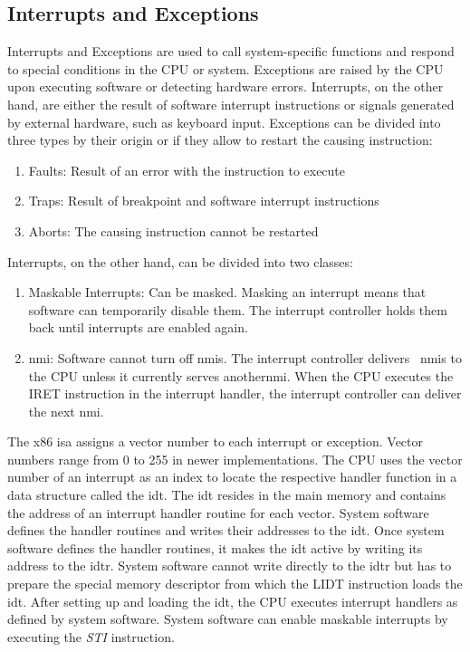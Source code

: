 \subsection{Interrupts and Exceptions}
\label{sec:state:technical:interrupts}
Interrupts and Exceptions are used to call system-specific functions and respond
to special conditions in the CPU or system. Exceptions are raised by the CPU
upon executing software or detecting hardware errors. Interrupts, on the other
hand, are either the result of software interrupt instructions or signals
generated by external hardware, such as keyboard input. Exceptions can be
divided into three types by their origin or if they allow to restart the causing
instruction:
\begin{enumerate}
  \item Faults: Result of an error with the instruction to execute
  \item Traps: Result of breakpoint and software interrupt instructions
  \item Aborts: The causing instruction cannot be restarted
\end{enumerate}
Interrupts, on the other hand, can be divided into two classes:
\begin{enumerate}
  \item Maskable Interrupts: Can be masked. Masking an interrupt means that
    software can temporarily disable them. The interrupt controller holds
    them back until interrupts are enabled again.
  \item \Gls{nmi}: Software cannot turn off \glspl{nmi}. The interrupt
    controller delivers~ \glspl{nmi} to the CPU unless it currently serves
    another\gls{nmi}. When the CPU executes the IRET instruction in the
    interrupt handler, the interrupt controller can deliver the next \gls{nmi}.
\end{enumerate}

The x86 \gls{isa} assigns a vector number to each interrupt or exception. Vector
numbers range from 0 to 255 in newer implementations. The CPU uses the vector
number of an interrupt as an index to locate the respective handler function in
a data structure called the \gls{idt}. The \gls{idt} resides in the main memory
and contains the address of an interrupt handler routine for each vector. System
software defines the handler routines and writes their addresses to the
\gls{idt}. Once system software defines the handler routines, it makes the
\gls{idt} active by writing its address to the \gls{idtr}. System software
cannot write directly to the \gls{idtr} but has to prepare the special memory
descriptor from which the LIDT instruction loads the \gls{idt}. After setting up
and loading the \gls{idt}, the CPU executes interrupt handlers as defined by
system software. System software can enable maskable interrupts by executing the
\textit{STI} instruction. \\

